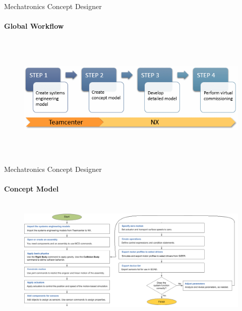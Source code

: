 \documentclass[aspectratio=169]{beamer}
\begin{document}
\begin{frame}[t]{Mechatronics Concept Designer}
\framesubtitle{Global Workflow}
    \vspace{-0.6cm}
    \begin{figure}[H]
        \centering\includegraphics[height=6cm,width=1\textwidth,keepaspectratio]{mcd_overview_flowchart.png}
        \label{fig:mcd_overview_flowchart.png}
    \end{figure}
\end{frame}

\begin{frame}[t]{Mechatronics Concept Designer}
\framesubtitle{Concept Model}
    \vspace{-0.6cm}
    \begin{figure}[H]
        \centering\includegraphics[height=6cm,width=1\textwidth,keepaspectratio]{mcd_concept_model_flowchart.png}
        \label{fig:mcd_concept_model_flowchart.png}
    \end{figure}
\end{frame}
\end{document}

